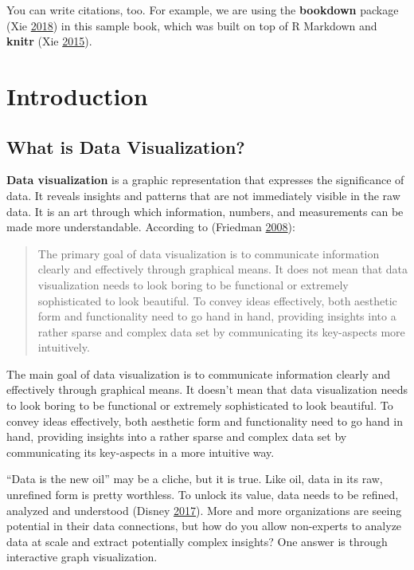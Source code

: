 \documentclass[]{book}
\begin{document}
You can write citations, too. For example, we are using the \textbf{bookdown} package (Xie \protect\hyperlink{ref-R-bookdown}{2018}) in this sample book, which was built on top of R Markdown and \textbf{knitr} (Xie \protect\hyperlink{ref-xie2015}{2015}).

\hypertarget{introduction}{%
\chapter{Introduction}\label{introduction}}

\hypertarget{what-is-data-visualization}{%
\section{What is Data Visualization?}\label{what-is-data-visualization}}

\textbf{Data visualization} is a graphic representation that expresses the significance of data. It reveals insights and patterns that are not immediately visible in the raw data. It is an art through which information, numbers, and measurements can be made more understandable. According to (Friedman \protect\hyperlink{ref-viz}{2008}):

\begin{quote}
The primary goal of data visualization is to communicate information clearly and effectively through graphical means. It does not mean that data visualization needs to look boring to be functional or extremely sophisticated to look beautiful. To convey ideas effectively, both aesthetic form and functionality need to go hand in hand, providing insights into a rather sparse and complex data set by communicating its key-aspects more intuitively.
\end{quote}

The main goal of data visualization is to communicate information clearly and effectively through graphical means. It doesn't mean that data visualization needs to look boring to be functional or extremely sophisticated to look beautiful. To convey ideas effectively, both aesthetic form and functionality need to go hand in hand, providing insights into a rather sparse and complex data set by communicating its key-aspects in a more intuitive way.

``Data is the new oil'' may be a cliche, but it is true. Like oil, data in its raw, unrefined form is pretty worthless. To unlock its value, data needs to be refined, analyzed and understood (Disney \protect\hyperlink{ref-lawfraud}{2017}). More and more organizations are seeing potential in their data connections, but how do you allow non-experts to analyze data at scale and extract potentially complex insights? One answer is through interactive graph visualization.
\end{document}
